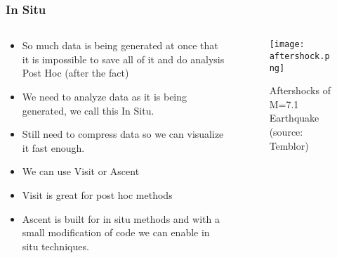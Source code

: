 \documentclass[pdf,8pt]{beamer}
\begin{document}
\begin{frame}
\frametitle{In Situ}
\begin{columns}
    \begin{column}{0.69\paperwidth}
    \begin{itemize}
        \item So much data is being generated at once that it is impossible to save
              all of it and do analysis Post Hoc (after the fact)
        \item We need to analyze data as it is being generated, we call this
              In Situ.
        \item Still need to compress data so we can visualize it fast enough.
        \item We can use Visit or Ascent
        \item Visit is great for post hoc methods
        \item Ascent is built for in situ methods and with a small modification of
              code we can enable in situ techniques.
    \end{itemize}
    \end{column}
    \begin{column}{0.3\paperwidth}
    \begin{figure}[ht]
        \texttt{[image: aftershock.png]}
    \caption{Aftershocks of M=7.1 Earthquake (source: Temblor)}
    \end{figure}
    \end{column}
\end{columns}
\end{frame}
\end{document}
